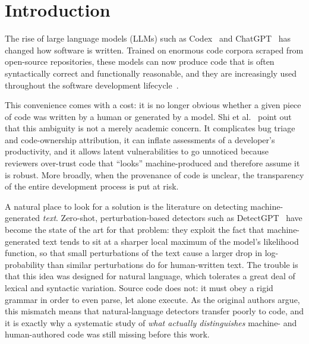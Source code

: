 \documentclass[manuscript,review]{acmart}
\begin{document}
\section{Introduction}
\label{sec:intro}

The rise of large language models (LLMs) such as Codex~\cite{chen2021evaluating} and ChatGPT~\cite{openai2022chatgpt} has changed how software is written. Trained on enormous code corpora scraped from open-source repositories, these models can now produce code that is often syntactically correct and functionally reasonable, and they are increasingly used throughout the software development lifecycle~\cite{roziere2023codellama}.

This convenience comes with a cost: it is no longer obvious whether a given piece of code was written by a human or generated by a model. Shi et al.~\cite{shi2024between} point out that this ambiguity is not a merely academic concern. It complicates bug triage and code-ownership attribution, it can inflate assessments of a developer's productivity, and it allows latent vulnerabilities to go unnoticed because reviewers over-trust code that ``looks'' machine-produced and therefore assume it is robust. More broadly, when the provenance of code is unclear, the transparency of the entire development process is put at risk.

A natural place to look for a solution is the literature on detecting machine-generated \emph{text}. Zero-shot, perturbation-based detectors such as DetectGPT~\cite{mitchell2023detectgpt} have become the state of the art for that problem: they exploit the fact that machine-generated text tends to sit at a sharper local maximum of the model's likelihood function, so that small perturbations of the text cause a larger drop in log-probability than similar perturbations do for human-written text. The trouble is that this idea was designed for natural language, which tolerates a great deal of lexical and syntactic variation. Source code does not: it must obey a rigid grammar in order to even parse, let alone execute. As the original authors argue, this mismatch means that natural-language detectors transfer poorly to code, and it is exactly why a systematic study of \emph{what actually distinguishes} machine- and human-authored code was still missing before this work.
\end{document}
